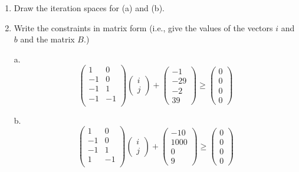 \documentclass[11pt]{article}
\begin{document}
\begin{enumerate}
	\item Draw the iteration spaces for (a) and (b).
		\begin{Answer}
		\end{Answer}
	\item Write the constraints in matrix form (i.e., give the values of the vectors $i$ and $b$ and the matrix $B$.)
		\begin{Answer}
		a.
		$$
		\begin{pmatrix}
		1 & 0  \\
		-1 & 0  \\
		-1 & 1 \\
		-1 & -1 \\
		\end{pmatrix}
		\begin{pmatrix}
		i \\
		j 
		\end{pmatrix}
		+
		\begin{pmatrix}
		-1 \\
		-29 \\
		-2 \\
		39
		\end{pmatrix}
		\ge
		\begin{pmatrix}
		0 \\
		0 \\
		0 \\
		0
		\end{pmatrix}
		$$
		
		b.
		$$
		\begin{pmatrix}
		1 & 0  \\
		-1 & 0  \\
		-1 & 1 \\
		1 & -1 \\
		\end{pmatrix}
		\begin{pmatrix}
		i \\
		j 
		\end{pmatrix}
		+
		\begin{pmatrix}
		-10 \\
		1000 \\
		0 \\
		9
		\end{pmatrix}
		\ge
		\begin{pmatrix}
		0 \\
		0 \\
		0 \\
		0
		\end{pmatrix}
		$$
		

\end{Answer}
\end{enumerate}
\end{document}
